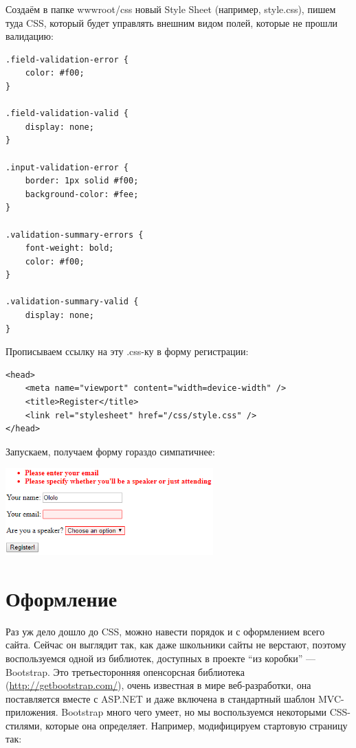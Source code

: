 \documentclass[a5paper]{article}
\begin{document}
Создаём в папке wwwroot/css новый Style Sheet (например, style.css), пишем туда CSS, который будет управлять внешним видом полей, которые не прошли валидацию:

\begin{verbatim}
.field-validation-error {
    color: #f00;
}

.field-validation-valid {
    display: none;
}

.input-validation-error {
    border: 1px solid #f00;
    background-color: #fee;
}

.validation-summary-errors {
    font-weight: bold;
    color: #f00;
}

.validation-summary-valid {
    display: none;
}
\end{verbatim}

Прописываем ссылку на эту .css-ку в форму регистрации:

\begin{verbatim}
<head>
    <meta name="viewport" content="width=device-width" />
    <title>Register</title>
    <link rel="stylesheet" href="/css/style.css" />
</head>
\end{verbatim}

Запускаем, получаем форму гораздо симпатичнее:

\begin{center}
    \includegraphics[width=0.6\textwidth]{validationErrorWithCss.png}
\end{center}

\section{Оформление}

Раз уж дело дошло до CSS, можно навести порядок и с оформлением всего сайта. Сейчас он выглядит так, как даже школьники сайты не верстают, поэтому воспользуемся одной из библиотек, доступных в проекте ``из коробки'' --- Bootstrap. Это третьесторонняя опенсорсная библиотека 
(\url{http://getbootstrap.com/}), очень известная в мире веб-разработки, она поставляется вместе с ASP.NET и даже включена в стандартный шаблон MVC-приложения. Bootstrap много чего умеет, но мы воспользуемся некоторыми CSS-стилями, которые она определяет. Например, модифицируем
стартовую страницу так:
\end{document}
